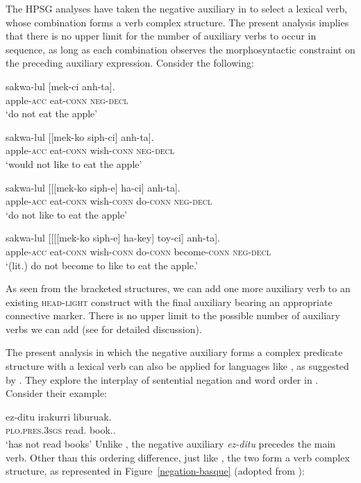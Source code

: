 \documentclass[output=paper
	        ,collection
	        ,collectionchapter
 	        ,biblatex
                ,babelshorthands
                ,newtxmath
                ,draftmode
                ,colorlinks, citecolor=brown
]{langscibook}
\begin{document}
\begin{exe}
\begin{xlist}
\begin{exe}
\begin{xlist}
The HPSG analyses have taken the negative auxiliary in 
to select a lexical verb, whose combination forms a verb complex
structure. The present analysis implies that there is no upper limit for the
number of auxiliary verbs to
occur in sequence, as long as each combination observes
the morphosyntactic constraint on the preceding auxiliary expression. Consider
the following:

\eal
\ex
\gll sakwa-lul          [mek-ci anh-ta]. \\
     apple-\textsc{acc} \spacebr{}eat-\textsc{conn} \textsc{neg}-\textsc{decl} \\
\glt`do not eat the apple'

\ex
\gll sakwa-lul          [[mek-ko siph-ci] anh-ta]. \\
     apple-\textsc{acc} \hspaceThis{[[}eat-\textsc{conn} wish-\textsc{conn} \textsc{neg}-\textsc{decl} \\
\glt`would not like to eat the apple'

\ex \label{negation-20c}
\gll sakwa-lul          [[[mek-ko siph-e] ha-ci] anh-ta]. \\
     apple-\textsc{acc} \hspaceThis{[[[}eat-\textsc{conn} wish-\textsc{conn} do-\textsc{conn} \textsc{neg}-\textsc{decl} \\
\glt`do not like to eat the apple'

\ex
\gll sakwa-lul          [[[[mek-ko siph-e] ha-key] toy-ci] anh-ta]. \\
     apple-\textsc{acc} \hspaceThis{[[[[}eat-\textsc{conn} wish-\textsc{conn} do-\textsc{conn} become-\textsc{conn} \textsc{neg}-\textsc{decl} \\
\glt`(lit.) do not become to like to eat the apple.'
\end{xlist} \end{exe}
%
As seen from the bracketed structures, we can add one more auxiliary verb to
an existing \textsc{head-light} construct with the final auxiliary bearing an appropriate
  connective marker. There is no upper limit to the possible number  of auxiliary
  verbs we can add (see \citealt[]{Kim:16} for detailed discussion).

The present analysis in which the  negative auxiliary forms a complex
predicate structure with a lexical verb can also be applied for languages
like , as suggested by \citet{CB:11}. They explore the interplay of sentential
negation and word order in . Consider their example:

\ea
\label{negation-basque-ex}
\gll ez-ditu irakurri liburuak. \\
     \textsc{plo}.\textsc{pres}.\textsc{3sgs} read.\PRF{} book.\ABS.\pl\\
\glt `has not read books'
\z
%
%
Unlike , the negative auxiliary \textit{ez-ditu} precedes
the main verb. Other than this ordering difference, just
like , the two form a verb complex structure, as represented in
Figure~\ref{negation-basque} (adopted from \citealt{CB:11}):


\end{xlist}
\end{exe}
\end{document}
